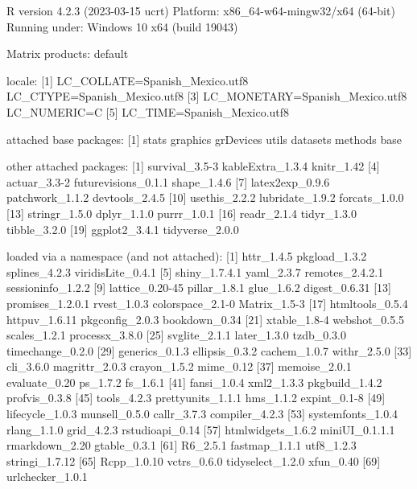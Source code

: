 \documentclass[
  a4paper,
  oneside,
  openany]{book}
\newenvironment{Shaded}{\begin{snugshade}}{\end{snugshade}}
\newcommand{\NormalTok}[1]{#1}
\begin{document}
\begin{Shaded}
\begin{Highlighting}[]
\NormalTok{R version 4.2.3 (2023{-}03{-}15 ucrt)}
\NormalTok{Platform: x86\_64{-}w64{-}mingw32/x64 (64{-}bit)}
\NormalTok{Running under: Windows 10 x64 (build 19043)}

\NormalTok{Matrix products: default}

\NormalTok{locale:}
\NormalTok{[1] LC\_COLLATE=Spanish\_Mexico.utf8  LC\_CTYPE=Spanish\_Mexico.utf8   }
\NormalTok{[3] LC\_MONETARY=Spanish\_Mexico.utf8 LC\_NUMERIC=C                   }
\NormalTok{[5] LC\_TIME=Spanish\_Mexico.utf8    }

\NormalTok{attached base packages:}
\NormalTok{[1] stats     graphics  grDevices utils     datasets  methods   base     }

\NormalTok{other attached packages:}
\NormalTok{ [1] survival\_3.5{-}3      kableExtra\_1.3.4    knitr\_1.42         }
\NormalTok{ [4] actuar\_3.3{-}2        futurevisions\_0.1.1 shape\_1.4.6        }
\NormalTok{ [7] latex2exp\_0.9.6     patchwork\_1.1.2     devtools\_2.4.5     }
\NormalTok{[10] usethis\_2.2.2       lubridate\_1.9.2     forcats\_1.0.0      }
\NormalTok{[13] stringr\_1.5.0       dplyr\_1.1.0         purrr\_1.0.1        }
\NormalTok{[16] readr\_2.1.4         tidyr\_1.3.0         tibble\_3.2.0       }
\NormalTok{[19] ggplot2\_3.4.1       tidyverse\_2.0.0    }

\NormalTok{loaded via a namespace (and not attached):}
\NormalTok{ [1] httr\_1.4.5        pkgload\_1.3.2     splines\_4.2.3     viridisLite\_0.4.1}
\NormalTok{ [5] shiny\_1.7.4.1     yaml\_2.3.7        remotes\_2.4.2.1   sessioninfo\_1.2.2}
\NormalTok{ [9] lattice\_0.20{-}45   pillar\_1.8.1      glue\_1.6.2        digest\_0.6.31    }
\NormalTok{[13] promises\_1.2.0.1  rvest\_1.0.3       colorspace\_2.1{-}0  Matrix\_1.5{-}3     }
\NormalTok{[17] htmltools\_0.5.4   httpuv\_1.6.11     pkgconfig\_2.0.3   bookdown\_0.34    }
\NormalTok{[21] xtable\_1.8{-}4      webshot\_0.5.5     scales\_1.2.1      processx\_3.8.0   }
\NormalTok{[25] svglite\_2.1.1     later\_1.3.0       tzdb\_0.3.0        timechange\_0.2.0 }
\NormalTok{[29] generics\_0.1.3    ellipsis\_0.3.2    cachem\_1.0.7      withr\_2.5.0      }
\NormalTok{[33] cli\_3.6.0         magrittr\_2.0.3    crayon\_1.5.2      mime\_0.12        }
\NormalTok{[37] memoise\_2.0.1     evaluate\_0.20     ps\_1.7.2          fs\_1.6.1         }
\NormalTok{[41] fansi\_1.0.4       xml2\_1.3.3        pkgbuild\_1.4.2    profvis\_0.3.8    }
\NormalTok{[45] tools\_4.2.3       prettyunits\_1.1.1 hms\_1.1.2         expint\_0.1{-}8     }
\NormalTok{[49] lifecycle\_1.0.3   munsell\_0.5.0     callr\_3.7.3       compiler\_4.2.3   }
\NormalTok{[53] systemfonts\_1.0.4 rlang\_1.1.0       grid\_4.2.3        rstudioapi\_0.14  }
\NormalTok{[57] htmlwidgets\_1.6.2 miniUI\_0.1.1.1    rmarkdown\_2.20    gtable\_0.3.1     }
\NormalTok{[61] R6\_2.5.1          fastmap\_1.1.1     utf8\_1.2.3        stringi\_1.7.12   }
\NormalTok{[65] Rcpp\_1.0.10       vctrs\_0.6.0       tidyselect\_1.2.0  xfun\_0.40        }
\NormalTok{[69] urlchecker\_1.0.1 }
\end{Highlighting}
\end{Shaded}
\end{document}

